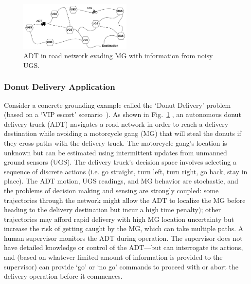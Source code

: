     
	\begin{figure}[t]%
    	\centering
     	\includegraphics[width=0.5\textwidth]{Figures/RoadNet}
    	\caption{ADT in road network evading MG with information from noisy UGS. } 
        \label{fig:RoadNet}
        \vspace{-0.2cm}
    \end{figure}    
    
\subsubsection{Donut Delivery Application} \label{sec:donut_delivery}
Consider a concrete grounding example called the `Donut Delivery' problem (based on a `VIP escort' scenario~\cite{Humphrey2012-lr}). As shown in Fig.~\ref{fig:RoadNet} , an autonomous donut delivery truck (ADT) navigates a road network in order to reach a delivery destination while avoiding a motorcycle gang (MG) that will steal the donuts if they cross paths with the delivery truck. The motorcycle gang's location is unknown but can be estimated using intermittent updates from unmanned ground sensors (UGS). The delivery truck's decision space involves selecting a sequence of discrete actions (i.e. go straight, turn left, turn right, go back, stay in place). The ADT motion, UGS readings, and MG behavior are stochastic, and the problems of decision making and sensing are strongly coupled: some trajectories through the network might allow the ADT to localize the MG before heading to the delivery destination but incur a high time penalty); other trajectories may afford rapid delivery with high MG location uncertainty but increase the risk of getting caught by the MG, which can take multiple paths. A human supervisor monitors the ADT during operation. The supervisor does not have detailed knowledge or control of the ADT---but can interrogate its actions, and (based on whatever limited amount of information is provided to the supervisor) can provide `go' or `no go' commands to proceed with or abort the delivery operation before it commences. 


